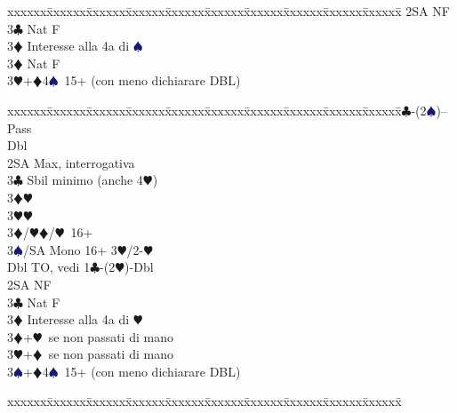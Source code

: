 \documentclass[a4paper,italian]{article}
\newcommand{\BC}{\textcolor{OliveGreen}{$\clubsuit$}}
\newcommand{\BD}{\textcolor{RedOrange}{$\vardiamondsuit$}}
\newcommand{\BH}{\textcolor{Red2}{$\varheartsuit${}}}
\newcommand{\BS}{\textcolor{MidnightBlue}{$\spadesuit${}}}
\newenvironment{bidtable}
{\begin{tabbing}

    xxxxxx\=xxxxxx\=xxxxxx\=xxxxxx\=xxxxxx\=xxxxxx\=xxxxxx\=xxxxxx\=xxxxxx\=xxxxxx\=\kill}
{\end{tabbing} }%
\begin{document}
\begin{multicols}{2}
\begin{bidtable}
                                            2SA \> NF\\
                                            3\BC \> Nat F\+\\
                                            3\BD \> Interesse alla 4a di \BS \-\\
                                            3\BD \> Nat F\\
                                            3\BH {}+\BD 4\BS\ 15+ (con meno dichiarare DBL)\-
                                        \end{bidtable}
                                        \begin{bidtable}
                                            1\BC-(2\BS)--\+\\
                                            Pass\+\\
                                            Dbl\+\\
                                            2SA\> Max, interrogativa\+\\
                                            3\BC\> Sbil minimo (anche 4\BH)\+\\
                                            3\BD{}\BH\\
                                            3\BH{}\BH\-\\
                                            3\BD/\BH{}\BD/\BH\ 16+\\
                                            3\BS/SA\> Mono 16+ 3\BH/2-\BH\-\-\-\\
                                            Dbl \> TO, vedi 1\BC-(2\BH)-Dbl\\
                                            2SA \> NF\\
                                            3\BC \> Nat F\+\\
                                            3\BD \> Interesse alla 4a di \BH \-\\
                                            3\BD {}+\BH\ se non passati di mano\\
                                            3\BH {}+\BD\ se non passati di mano\\
                                            3\BS {}+\BD 4\BS\ 15+ (con meno dichiarare DBL)\-
                                        \end{bidtable}
                                        \begin{bidtable}

\end{bidtable}
\end{multicols}
\end{document}
